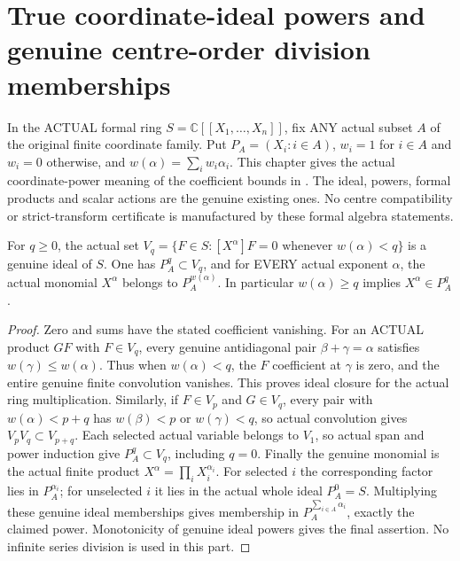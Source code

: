 \section{True coordinate-ideal powers and genuine centre-order division memberships}

In the ACTUAL formal ring $S=\mathbb C[[X_1,\ldots,X_n]]$, fix ANY
actual subset $A$ of the original finite coordinate family. Put
$P_A=(X_i:i\in A)$, $w_i=1$ for $i\in A$ and $w_i=0$ otherwise,
and $w(\alpha)=\sum_iw_i\alpha_i$. This chapter gives the actual
coordinate-power meaning of the coefficient bounds in
\cite[Lemma~7.22 and Corollary~7.24, pp.~269--270]{bierstone-milman97-invent-math}.
The ideal, powers, formal products and scalar actions are the genuine
existing ones. No centre compatibility or strict-transform certificate
is manufactured by these formal algebra statements.

\begin{lemma}
\label{hir:actual-formal-coordinate-weight-vanishing-ideal}
For $q\ge0$, the actual set
$V_q=\{F\in S:[X^\alpha]F=0\text{ whenever }w(\alpha)<q\}$
is a genuine ideal of $S$. One has $P_A^q\subset V_q$, and for EVERY
actual exponent $\alpha$, the actual monomial $X^\alpha$ belongs to
$P_A^{w(\alpha)}$. In particular $w(\alpha)\ge q$ implies
$X^\alpha\in P_A^q$.
\leanok
\end{lemma}
\begin{proof}
Zero and sums have the stated coefficient vanishing. For an ACTUAL
product $GF$ with $F\in V_q$, every genuine antidiagonal pair
$\beta+\gamma=\alpha$ satisfies $w(\gamma)\le w(\alpha)$.
Thus when $w(\alpha)<q$, the $F$ coefficient at $\gamma$ is zero,
and the entire genuine finite convolution vanishes. This proves ideal
closure for the actual ring multiplication.
Similarly, if $F\in V_p$ and $G\in V_q$, every pair with
$w(\alpha)<p+q$ has $w(\beta)<p$ or $w(\gamma)<q$, so actual
convolution gives $V_pV_q\subset V_{p+q}$. Each selected actual
variable belongs to $V_1$, so actual span and power induction give
$P_A^q\subset V_q$, including $q=0$.
Finally the genuine monomial is the actual finite product
$X^\alpha=\prod_iX_i^{\alpha_i}$. For selected $i$ the corresponding
factor lies in $P_A^{\alpha_i}$; for unselected $i$ it lies in the
actual whole ideal $P_A^0=S$. Multiplying these genuine ideal
memberships gives membership in $P_A^{\sum_{i\in A}\alpha_i}$,
exactly the claimed power. Monotonicity of genuine ideal powers gives
the final assertion. No infinite series division is used in this part.
\end{proof}

